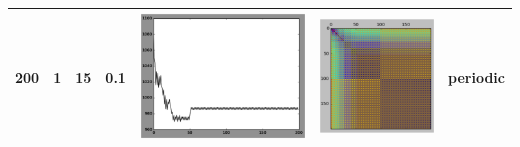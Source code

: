 \begin{table}
\begin{tabular}{@{}|l|l|l|l|l|l|l|@{}}
			200 & 1 & 15 & 0.1 & \includegraphics[scale=0.4]{fig/fmridti/sat3.eps} & \includegraphics[scale=0.6]{fig/fmridti/sat3d.eps} & periodic \\ \bottomrule \bottomrule
		\end{tabular}%
\end{table}

